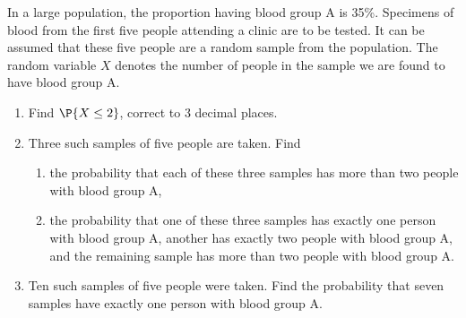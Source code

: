 \begin{problem}
    In a large population, the proportion having blood group A is 35\%. Specimens of blood from the first five people attending a clinic are to be tested. It can be assumed that these five people are a random sample from the population. The random variable $X$ denotes the number of people in the sample we are found to have blood group A.

    \begin{enumerate}
        \item Find $\P{X \leq 2}$, correct to 3 decimal places.
        \item Three such samples of five people are taken. Find
        \begin{enumerate}
            \item the probability that each of these three samples has more than two people with blood group A,
            \item the probability that one of these three samples has exactly one person with blood group A, another has exactly two people with blood group A, and the remaining sample has more than two people with blood group A.
        \end{enumerate}
        \item Ten such samples of five people were taken. Find the probability that seven samples have exactly one person with blood group A.
    \end{enumerate}
\end{problem}
\begin{solution}
    
\end{solution}

